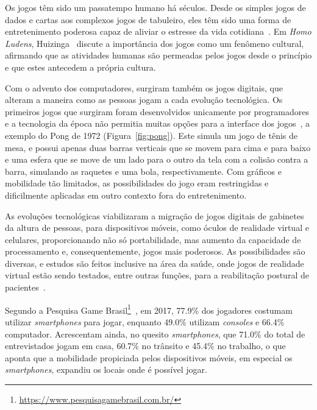 Os jogos têm sido um passatempo humano há séculos. Desde os simples jogos de dados e cartas aos complexos jogos de tabuleiro, eles têm sido uma forma de entretenimento poderosa capaz de aliviar o estresse da vida cotidiana~\cite{netzley_how_2015}. Em \textit{Homo Ludens}, Huizinga~\cite{huizinga_homo_1980} discute a importância dos jogos como um fenômeno cultural, afirmando que as atividades humanas são permeadas pelos jogos desde o princípio e que estes antecedem a própria cultura. 

Com o advento dos computadores, surgiram também os jogos digitais, que alteram  a maneira como as pessoas jogam a cada evolução tecnológica. Os primeiros jogos que surgiram foram desenvolvidos unicamente por programadores e a tecnologia da época não permitia muitas opções para a interface dos jogos~\cite[~p. 16-50]{mendes_estilo_2013}, a exemplo do Pong de 1972 (Figura~\ref{fig:pong}). Este simula um jogo de tênis de mesa, e possui apenas duas barras verticais que se movem para cima e para baixo e uma esfera que se move de um lado para o outro da tela com a colisão contra a barra, simulando as raquetes e uma bola, respectivamente. Com gráficos e mobilidade tão limitados, as possibilidades do jogo eram restringidas e dificilmente aplicadas em outro contexto fora do entretenimento.


As evoluções tecnológicas viabilizaram a migração de jogos digitais de gabinetes da altura de pessoas, para dispositivos móveis, como óculos de realidade virtual e celulares, proporcionando não só portabilidade, mas aumento da capacidade de processamento e, consequentemente, jogos mais poderosos. As possibilidades são diversas, e estudos são feitos inclusive na área da saúde, onde jogos de realidade virtual estão sendo testados, entre outras funções, para a reabilitação postural de pacientes~\cite{lima_reabilitacao_2017}.

Segundo a Pesquisa Game Brasil\footnote{\url{https://www.pesquisagamebrasil.com.br/}}~\cite{sioux_pesquisa_2017}, em 2017, 77.9\% dos jogadores costumam utilizar \textit{smartphones} para jogar, enquanto 49.0\% utilizam \textit{consoles} e 66.4\% computador. Acrescentam ainda, no quesito \textit{smartphones}, que 71.0\% do total de entrevistados jogam em casa, 60.7\% no trânsito e 45.4\% no trabalho, o que aponta que a mobilidade propiciada pelos dispositivos móveis, em especial os \textit{smartphones},  expandiu os locais onde é possível jogar.

